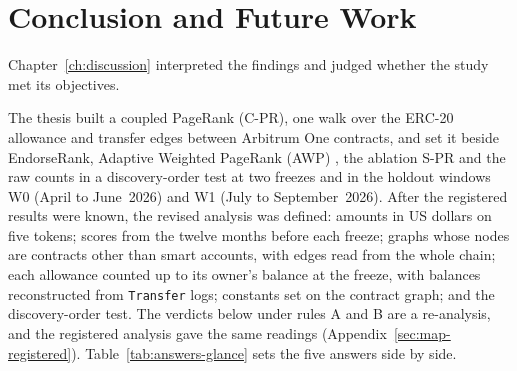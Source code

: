 \chapter{Conclusion and Future Work}
\label{ch:conclusion}

Chapter~\ref{ch:discussion} interpreted the findings and judged whether the study met its objectives.


The thesis built a coupled PageRank (\mbox{C-PR}), one walk over the ERC-20 allowance and transfer edges between Arbitrum One contracts, and set it beside EndorseRank, Adaptive Weighted PageRank (AWP) \parencite{do2023awp}, the ablation \mbox{S-PR} and the raw counts in a discovery-order test at two freezes and in the holdout windows W0 (April to June~2026) and W1 (July to September~2026). After the registered results were known, the revised analysis was defined: amounts in US dollars on five tokens; scores from the twelve months before each freeze; graphs whose nodes are contracts other than smart accounts, with edges read from the whole chain; each allowance counted up to its owner's balance at the freeze, with balances reconstructed from \texttt{Transfer} logs; constants set on the contract graph; and the discovery-order test. The verdicts below under rules A and B are a re-analysis, and the registered analysis gave the same readings (Appendix~\ref{sec:map-registered}). Table~\ref{tab:answers-glance} sets the five answers side by side.

